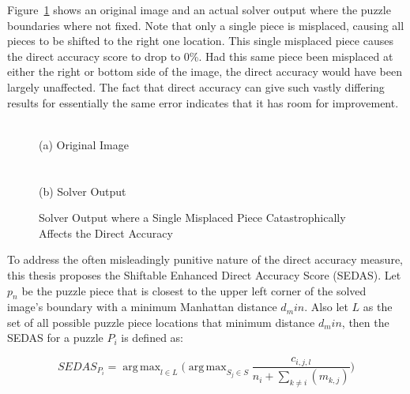 \documentclass{report}
\DeclareMathOperator*{\argmax}{arg\,max} %
\begin{document}
Figure~\ref{fig:directAccuracyOnePieceEffect} shows an original image and an actual solver output where the puzzle boundaries where not fixed.  Note that only a single piece is misplaced, causing all pieces to be shifted to the right one location.  This single misplaced piece causes the direct accuracy score to drop to 0\%.  Had this same piece been misplaced at either the right or bottom side of the image, the direct accuracy would have been largely unaffected.  The fact that direct accuracy can give such vastly differing results for essentially the same error indicates that it has room for improvement.

\begin{figure}
\centering
{}
\\
(a) Original Image
\\ ~\\
\\
(b) Solver Output
\caption{Solver Output where a Single Misplaced Piece Catastrophically Affects the Direct Accuracy}
\label{fig:directAccuracyOnePieceEffect}
\end{figure}

To address the often misleadingly punitive nature of the direct accuracy measure, this thesis proposes the Shiftable Enhanced Direct Accuracy Score (SEDAS).  Let $p_n$ be the puzzle piece that is closest to the upper left corner of the solved image's boundary with a minimum Manhattan distance $d_min$.  Also let $L$ as the set of all possible puzzle piece locations that minimum distance $d_min$, then the SEDAS for a puzzle $P_i$ is defined as:

\begin{equation} \label{eq:shiftableEnhancedDirectAccuracyScore}
SEDAS_{P_i} = \argmax_{l \in L} \Big( \argmax_{S_j \in S}\frac{c_{i,j,l}}{n_i + \sum_{k \ne i}(m_{k,j})} \Big)
\end{equation}
\end{document}
